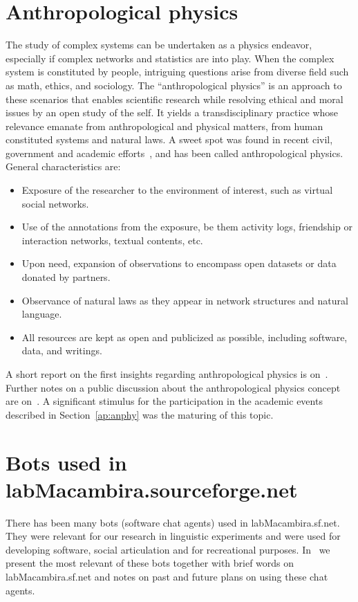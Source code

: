 \begin{apendicesenv}
\section{Anthropological physics}
The study of complex systems can be undertaken as a physics endeavor,
especially if complex networks and statistics are into play. When the complex
system is constituted by people, intriguing questions arise from diverse field such as math, ethics, and sociology.
The “anthropological physics” is an approach to these scenarios that enables scientific research while resolving ethical and moral issues by an open study of the self.
	It yields a transdisciplinary practice whose relevance emanate from anthropological
and physical matters, from human constituted systems and natural laws.
A sweet spot was found in recent civil, government and academic efforts~\cite{opa,ensaio}, and has been called anthropological physics. General characteristics are:
\begin{itemize}
	\item Exposure of the researcher to the environment of interest, such as virtual social networks.
	\item Use of the annotations from the exposure, be them activity logs, friendship or interaction networks, textual contents, etc.
	\item Upon need, expansion of observations to encompass open datasets or data donated by partners.
	\item Observance of natural laws as they appear in network structures and natural language.
	\item All resources are kept as open and publicized as possible, including software, data, and writings.
\end{itemize}                                                                                                                                     
A short report on the first insights regarding anthropological physics is on~\cite{anPhy}.
Further notes on a public discussion about the anthropological physics concept are on~\cite{anPhy2}.
A significant stimulus for the participation in the academic events described in Section~\ref{ap:anphy}
was the maturing of this topic.

\section{Bots used in labMacambira.sourceforge.net}
There has been many bots (software chat agents) used in labMacambira.sf.net.
They were relevant for our research in linguistic experiments and were used
for developing software, social articulation and for recreational purposes.
In~\cite{trabBots} we present the most relevant of these bots together with
brief words on labMacambira.sf.net and notes on past and future plans on using
these chat agents.


\end{apendicesenv}
